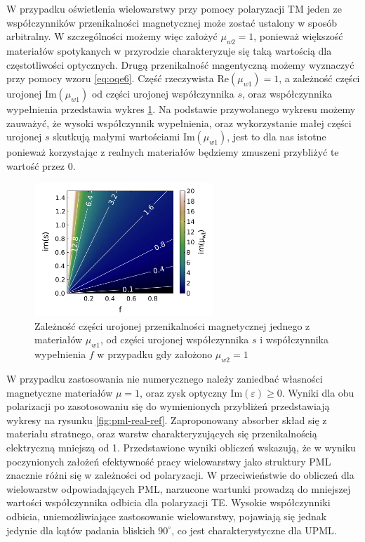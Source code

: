 W przypadku oświetlenia wielowarstwy przy pomocy polaryzacji TM jeden ze współczynników przenikalności magnetycznej może zostać ustalony w sposób arbitralny. W szczególności możemy więc założyć $\mu_{w2}=1$, ponieważ większość materiałów spotykanych w przyrodzie charakteryzuje się taką wartością dla częstotliwości optycznych. Drugą przenikalność magentyczną możemy wyznaczyć przy pomocy wzoru \ref{eq:oqe6}. Część rzeczywista $\textrm{Re}(\mu_{w1})=1$, a zależność części urojonej $\textrm{Im}(\mu_{w1})$ od części urojonej współczynnika $s$, oraz współczynnika wypełnienia przedstawia wykres \ref{fig:im-mu1}. Na podstawie przywołanego wykresu możemy zauważyć, że wysoki współczynnik wypełnienia, oraz wykorzystanie małej części urojonej $s$ skutkują małymi wartościami $\textrm{Im}(\mu_{w1})$, jest to dla nas istotne ponieważ korzystając z realnych materiałów będziemy zmuszeni przybliżyć te wartość przez $0$.

\begin{figure}
	\includegraphics[width=0.6\textwidth]{images/pml/fig4.png}
	\caption{Zależność części urojonej przenikalności magnetycznej jednego z materiałów $\mu_{w1}$, od części urojonej współczynnika $s$ i współczynnika wypełnienia $f$ w przypadku gdy założono $\mu_{w2}=1$}
	\label{fig:im-mu1}
\end{figure}


W przypadku zastosowania nie numerycznego należy zaniedbać własności magnetyczne materiałów $\mu=1$, oraz zysk optyczny $\textrm{Im}(\varepsilon)\ge0$. Wyniki dla obu polarizacji po zasotosowaniu się do wymienionych przybliżeń przedstawiają wykresy na rysunku \ref{fig:pml-real-ref}. Zaproponowany absorber skład się z materiału stratnego, oraz warstw charakteryzujących się przenikalnością elektryczną mniejszą od 1. Przedstawione wyniki obliczeń wskazują, że w wyniku poczynionych założeń efektywność pracy wielowarstwy jako struktury PML znacznie różni się w zależności od polaryzacji. W przeciwieństwie do obliczeń dla wielowarstw odpowiadających PML, narzucone wartunki prowadzą do mniejszej wartości współczynnika odbicia dla polaryzacji TE. Wysokie współczynniki odbicia, uniemożliwiające zastosowanie wielowarstwy,  pojawiają się jednak jedynie dla kątów padania bliskich $90^{\circ}$, co jest charakterystyczne dla UPML.

